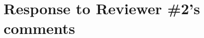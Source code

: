 \documentclass[11pt,letterpaper]{report}
\makeatletter
\newcommand{\EA}{\textit{Ea.\@}\xspace}
\makeatother
\begin{document}
\begin{enumerate}[label=\textit{1.\arabic*},wide, labelwidth=!, labelindent=0pt]



\end{enumerate}

\clearpage

\section*{Response to Reviewer \#2's comments}
\label{rev2}
\end{document}
